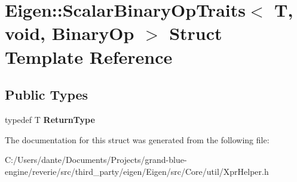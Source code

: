 \hypertarget{struct_eigen_1_1_scalar_binary_op_traits_3_01_t_00_01void_00_01_binary_op_01_4}{}\section{Eigen\+::Scalar\+Binary\+Op\+Traits$<$ T, void, Binary\+Op $>$ Struct Template Reference}
\label{struct_eigen_1_1_scalar_binary_op_traits_3_01_t_00_01void_00_01_binary_op_01_4}
\subsection*{Public Types}
\begin{DoxyCompactItemize}
\item 
\mbox{\label{struct_eigen_1_1_scalar_binary_op_traits_3_01_t_00_01void_00_01_binary_op_01_4_ab0051f4547c36694de736a63b33c7ff4}} 
typedef T {\bfseries Return\+Type}
\end{DoxyCompactItemize}


The documentation for this struct was generated from the following file\+:\begin{DoxyCompactItemize}
\item 
C\+:/\+Users/dante/\+Documents/\+Projects/grand-\/blue-\/engine/reverie/src/third\+\_\+party/eigen/\+Eigen/src/\+Core/util/Xpr\+Helper.\+h\end{DoxyCompactItemize}

